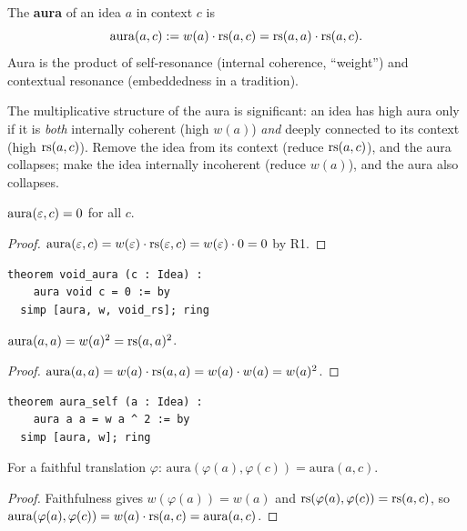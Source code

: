 \begin{definition}[Aura]
\label{def:aura}
The \textbf{aura} of an idea $a$ in context $c$ is
\[
  \mathrm{aura}(a, c) := w(a) \cdot \mathrm{rs}(a, c)
    = \mathrm{rs}(a, a) \cdot \mathrm{rs}(a, c).
\]
Aura is the product of self-resonance (internal coherence, ``weight'')
and contextual resonance (embeddedness in a tradition).
\end{definition}

The multiplicative structure of the aura is significant: an idea has
high aura only if it is \emph{both} internally coherent (high $w(a)$)
\emph{and} deeply connected to its context (high $\mathrm{rs}(a, c)$).  Remove
the idea from its context (reduce $\mathrm{rs}(a, c)$), and the aura collapses;
make the idea internally incoherent (reduce $w(a)$), and the aura also
collapses.

\begin{theorem}
\label{thm:void-aura}
$\mathrm{aura}(\varepsilon, c) = 0$ for all $c$.
\end{theorem}

\begin{proof}
$\mathrm{aura}(\varepsilon, c) = w(\varepsilon) \cdot \mathrm{rs}(\varepsilon, c)
= w(\varepsilon) \cdot 0 = 0$ by R1.
\end{proof}

\begin{lstlisting}
theorem void_aura (c : Idea) :
    aura void c = 0 := by
  simp [aura, w, void_rs]; ring
\end{lstlisting}

\begin{theorem}
\label{thm:aura-self}
$\mathrm{aura}(a, a) = w(a)^2 = \mathrm{rs}(a, a)^2$.
\end{theorem}

\begin{proof}
$\mathrm{aura}(a, a) = w(a) \cdot \mathrm{rs}(a, a) = w(a) \cdot w(a) = w(a)^2$.
\end{proof}

\begin{lstlisting}
theorem aura_self (a : Idea) :
    aura a a = w a ^ 2 := by
  simp [aura, w]; ring
\end{lstlisting}

\begin{theorem}
\label{thm:aura-translation}
For a faithful translation $\varphi$:
$\mathrm{aura}(\varphi(a), \varphi(c)) = \mathrm{aura}(a, c)$.
\end{theorem}

\begin{proof}
Faithfulness gives $w(\varphi(a)) = w(a)$ and
$\mathrm{rs}(\varphi(a), \varphi(c)) = \mathrm{rs}(a, c)$, so
$\mathrm{aura}(\varphi(a), \varphi(c)) = w(a) \cdot \mathrm{rs}(a, c)
= \mathrm{aura}(a, c)$.
\end{proof}

